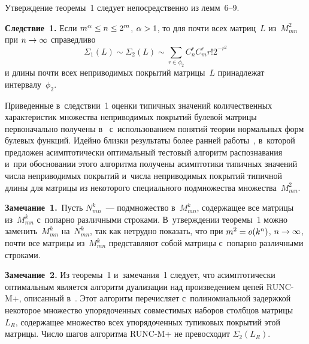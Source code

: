 \begin{multicols}{2}
    Утверждение теоремы~1 следует непосредственно из лемм~6--9. 
    
    \smallskip
    
    \noindent
    \textbf{Следствие~1.} Если $m^\alpha\hm\leq n\hm\leq 2^m$, 
$\alpha\hm>1$, то для почти всех матриц~$L$ из~$M^2_{mn}$ при $n\hm\to 
\infty$ справедливо
    $$
    \Sigma_1(L)\sim\Sigma_2(L)\sim \sum\limits_{r\in\phi_2} C_n^r C_m^r r! 
2^{-r^2}
    $$
и длины почти всех неприводимых покрытий мат\-ри\-цы~$L$ принадлежат 
интервалу~$\phi_2$.
    \smallskip
    
    Приведенные в~следствии~1 оценки типичных значений количественных 
характеристик множества неприводимых покрытий булевой матрицы 
первоначально получены в~\cite{9-duk} с~использованием понятий теории 
нормальных форм булевых функций. Идейно близки  результаты более ранней 
работы~\cite{5-duk}, в~которой предложен асимптотически оптимальный 
тестовый алгоритм распознавания и~при обосновании этого алгоритма 
получены асимптотики типичных значений числа неприводимых покрытий 
и~числа неприводимых покрытий типичной длины для матрицы из некоторого 
специального подмножества множества~$M^2_{mn}$. 
    
    \smallskip
    
    \noindent
    \textbf{Замечание~1.}\ Пусть $N_{mn}^k$~--- подмножество 
в~$M^k_{mn}$, содержащее все матрицы из~$M^k_{mn}$ с~попарно 
различными строками. В~утверждении теоремы~1 можно 
заменить~$M^k_{mn}$ на~$N^k_{mn}$, так как нетрудно показать, что при 
$m^2\hm= o(k^n)$, $n\hm\to \infty$, почти все матрицы из~$M^k_{mn}$  
представляют собой  матрицы с~попарно различными строками. 
    
    \smallskip
    
    \noindent
    \textbf{Замечание~2.} Из теоремы~1 и~замечания~1 следует, что 
асимптотически оптимальным является алгоритм дуализации над 
произведением цепей \mbox{RUNC-M+}, описанный в~\cite{8-duk}. Этот алгоритм 
перечисляет с~полиномиальной задержкой некоторое множество 
упорядоченных совместимых наборов столбцов матрицы~$L_R$, содержащее 
множество всех упорядоченных тупиковых покрытий этой матрицы. Число 
шагов алгоритма RUNC-M+ не превосходит $\Sigma_2(L_R)$.
  

\end{multicols}
